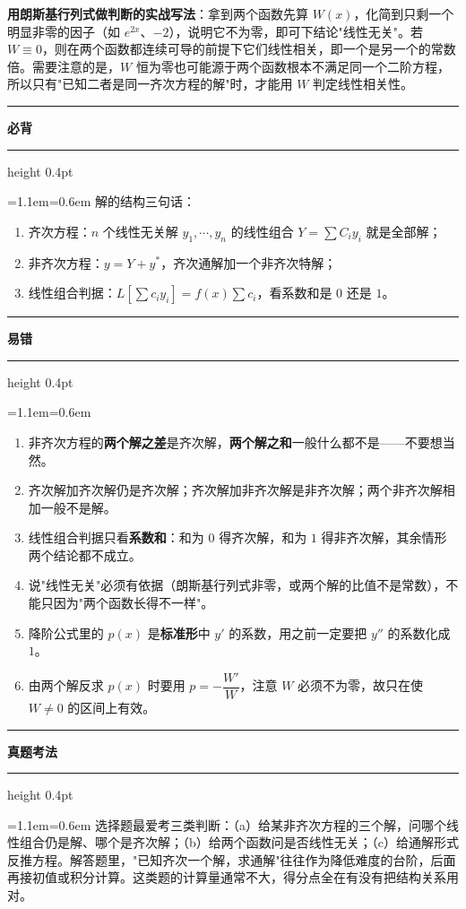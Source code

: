 \documentclass[11pt,openany,UTF8]{ctexbook}
\newcommand{\callouthead}[2]{%
  \par\addvspace{7pt}\noindent
  {\color{#1}\rule[-0.15em]{3pt}{1.05em}}\hspace{0.5em}%
  {\bfseries\color{#1}#2}\par\nobreak\vspace{-0.35em}%
  {\color{rulesep}\hrule height 0.4pt}\nobreak\vspace{0.45em}%
  \begingroup\small\setlength{\parindent}{0pt}%
  \leftskip=1.1em\rightskip=0.6em\noindent\ignorespaces}
\newcommand{\calloutend}{\par\endgroup\addvspace{7pt}}
\newenvironment{callkey}[1]{\callouthead{keybar}{#1}}{\calloutend}
\newenvironment{callwarn}[1]{\callouthead{warnbar}{#1}}{\calloutend}
\newenvironment{callexam}[1]{\callouthead{exambar}{#1}}{\calloutend}
\begin{document}
\textbf{用朗斯基行列式做判断的实战写法}：拿到两个函数先算 $W(x)$，化简到只剩一个明显非零的因子（如 $e^{2x}$、$-2$），说明它不为零，即可下结论"线性无关"。若 $W\equiv 0$，则在两个函数都连续可导的前提下它们线性相关，即一个是另一个的常数倍。需要注意的是，$W$ 恒为零也可能源于两个函数根本不满足同一个二阶方程，所以只有"已知二者是同一齐次方程的解"时，才能用 $W$ 判定线性相关性。

\begin{callkey}{必背}
解的结构三句话：

\begin{enumerate}
\item 齐次方程：$n$ 个线性无关解 $y_1,\cdots,y_n$ 的线性组合 $Y=\sum C_iy_i$ 就是全部解；
\item 非齐次方程：$y=Y+y^{*}$，齐次通解加一个非齐次特解；
\item 线性组合判据：$L\!\left[\sum c_iy_i\right]=f(x)\sum c_i$，看系数和是 $0$ 还是 $1$。
\end{enumerate}
\end{callkey}

\begin{callwarn}{易错}
\begin{enumerate}
\item 非齐次方程的\textbf{两个解之差}是齐次解，\textbf{两个解之和}一般什么都不是——不要想当然。
\item 齐次解加齐次解仍是齐次解；齐次解加非齐次解是非齐次解；两个非齐次解相加一般不是解。
\item 线性组合判据只看\textbf{系数和}：和为 $0$ 得齐次解，和为 $1$ 得非齐次解，其余情形两个结论都不成立。
\item 说"线性无关"必须有依据（朗斯基行列式非零，或两个解的比值不是常数），不能只因为"两个函数长得不一样"。
\item 降阶公式里的 $p(x)$ 是\textbf{标准形}中 $y'$ 的系数，用之前一定要把 $y''$ 的系数化成 $1$。
\item 由两个解反求 $p(x)$ 时要用 $p=-\dfrac{W'}{W}$，注意 $W$ 必须不为零，故只在使 $W\ne 0$ 的区间上有效。
\end{enumerate}
\end{callwarn}

\begin{callexam}{真题考法}
选择题最爱考三类判断：（a）给某非齐次方程的三个解，问哪个线性组合仍是解、哪个是齐次解；（b）给两个函数问是否线性无关；（c）给通解形式反推方程。解答题里，"已知齐次一个解，求通解"往往作为降低难度的台阶，后面再接初值或积分计算。这类题的计算量通常不大，得分点全在有没有把结构关系用对。

\end{callexam}
\end{document}
